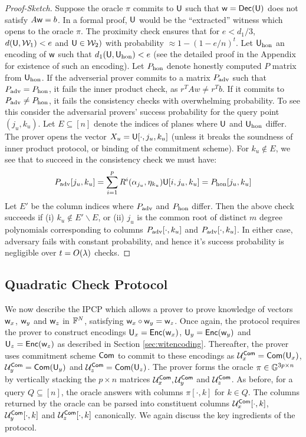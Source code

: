 \begin{proof}[Proof-Sketch]
Suppose the oracle $\pi$ commits to $\mathsf{U}$ such that $\mathsf{w}=\mathsf{Dec}(\mathsf{U})$ does
not satisfy $A\mathsf{w}=b$.  In a formal proof, $\mathsf{U}$ would be the ``extracted''
witness which opens to the oracle $\pi$. The proximity check ensures that for
$e<d_1/3$, $d(\mathsf{U},\mathcal{W}_1)<e$ and $\mathsf{U}\in \mathcal{W}_2)$ with probability $\approx 1-(1-e/n)^t$.
Let $\mathsf{U}_{\rm hon}$ an encoding of $\mathsf{w}$ such that $d_1(\mathsf{U},\mathsf{U}_{\rm
hon})<e$ (see the detailed proof in the Appendix for existence of such an
encoding). Let $P_{\rm hon}$ denote honestly computed $P$ matrix from
$\mathsf{U}_{\rm hon}$. If the adverserial prover commits to a matrix $P_{\rm adv}$
such that $P_{\rm adv}=P_{\rm hon}$, it fails the inner product check, as
$r^TAw\neq r^Tb$. If it commits to $P_{\rm adv}\neq P_{\rm hon}$, it fails the
consistency checks with overwhelming probability. To see this consider the
adversarial provers' success probability for the query point $(j_u,k_u)$. Let
$E\subseteq [n]$ denote the indices of planes where $\mathsf{U}$ and $\mathsf{U}_{\rm
hon}$ differ. The prover opens the vector $X_u=\mathsf{U}[\cdot,j_u,k_u]$ (unless it breaks the
soundness of inner product protocol, or binding of the commitment scheme). For
$k_u\not\in E$, we see that to succeed in the consistency check we must have: 
\[ P_{\rm adv}[j_u,k_u]=\sum_{i=1}^p
R^i(\alpha_{j_u},\eta_{k_u})\mathsf{U}[i,j_u,k_u]=P_{\rm hon}[j_u,k_u] \]
Let $E'$ be the column indices where $P_{\rm adv}$ and $P_{\rm hon}$ differ.
Then the above check succeeds if (i) $k_u\not\in E'\backslash E$, or (ii) $j_u$
is the common root of distinct $m$ degree polynomials corresponding to columns
$P_{\rm adv}[\cdot,k_u]$ and $P_{\rm adv}[\cdot,k_u]$. In either case, adversary
fails with constant probability, and hence it's success probability is
negligible over $t=O(\lambda)$ checks.
\end{proof}


\subsection{Quadratic Check Protocol}
We now describe the IPCP which allows a prover to prove knowledge of vectors
$\mathsf{w}_x$, $\mathsf{w}_y$ and $\mathsf{w}_z$ in $\mathbb{F}^N$, satisfying $\mathsf{w}_x\circ \mathsf{w}_y =
\mathsf{w}_z$. Once again, the protocol requires the prover to construct encodings
$\mathsf{U}_x=\mathsf{Enc}(\mathsf{w}_x)$, $\mathsf{U}_y=\mathsf{Enc}(\mathsf{w}_y)$ and $\mathsf{U}_z=\mathsf{Enc}(\mathsf{w}_z)$ as
described in Section \ref{sec:witencoding}. Thereafter, the prover uses
commitment scheme $\mathsf{Com}$ to commit to these encodings as $\mathcal{U}^{\mathsf{Com}}_x =
\mathsf{Com}(\mathsf{U}_x)$, $\mathcal{U}^{\mathsf{Com}}_y = \mathsf{Com}(\mathsf{U}_y)$ and $\mathcal{U}^{\mathsf{Com}}_z = \mathsf{Com}(\mathsf{U}_z)$. 
The prover forms the oracle $\pi\in \mathbb{G}^{3p\times n}$ by vertically stacking the
$p\times n$ matrices $\mathcal{U}^{\mathsf{Com}}_x,\mathcal{U}^{\mathsf{Com}}_y$ and $\mathcal{U}^{\mathsf{Com}}_z$. As before,
for a query $Q\subseteq [n]$, the oracle answers with columns $\pi[\cdot,k]$ for
$k\in Q$. The columns returned by the oracle can be parsed into constituent columns 
$\mathcal{U}^{\mathsf{Com}}_x[\cdot,k]$, $\mathcal{U}^{\mathsf{Com}}_y[\cdot,k]$ and $\mathcal{U}^{\mathsf{Com}}_z[\cdot,k]$
canonically. We again discuss the key ingredients of the protocol.

